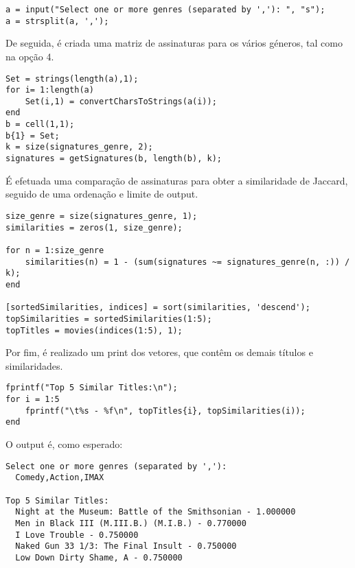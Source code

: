 \documentclass[portuguese, 11pt, a4paper,titlepage, oneside]{article}
\begin{document}
\begin{lstlisting}[style=Matlab-editor]
a = input("Select one or more genres (separated by ','): ", "s");
a = strsplit(a, ',');
\end{lstlisting}

De seguida, é criada uma matriz de assinaturas para os vários géneros, tal como na opção 4.
\begin{lstlisting}[style=Matlab-editor]
Set = strings(length(a),1);
for i= 1:length(a)
    Set(i,1) = convertCharsToStrings(a(i));
end
b = cell(1,1);
b{1} = Set;
k = size(signatures_genre, 2);
signatures = getSignatures(b, length(b), k);
\end{lstlisting}

É efetuada uma comparação de assinaturas para obter a similaridade de Jaccard, seguido de uma ordenação e limite de output.
\begin{lstlisting}[style=Matlab-editor]
size_genre = size(signatures_genre, 1);
similarities = zeros(1, size_genre);

for n = 1:size_genre
    similarities(n) = 1 - (sum(signatures ~= signatures_genre(n, :)) / k);
end

[sortedSimilarities, indices] = sort(similarities, 'descend');
topSimilarities = sortedSimilarities(1:5);
topTitles = movies(indices(1:5), 1);
\end{lstlisting}

Por fim, é realizado um print dos vetores, que contêm os demais títulos e similaridades.
\begin{lstlisting}[style=Matlab-editor]
fprintf("Top 5 Similar Titles:\n");
for i = 1:5
    fprintf("\t%s - %f\n", topTitles{i}, topSimilarities(i));
end
\end{lstlisting}

O output é, como esperado:
\begin{lstlisting}[style=Matlab-editor]
Select one or more genres (separated by ','): 
  Comedy,Action,IMAX

Top 5 Similar Titles:
  Night at the Museum: Battle of the Smithsonian - 1.000000
  Men in Black III (M.III.B.) (M.I.B.) - 0.770000
  I Love Trouble - 0.750000
  Naked Gun 33 1/3: The Final Insult - 0.750000
  Low Down Dirty Shame, A - 0.750000
\end{lstlisting}
\end{document}

